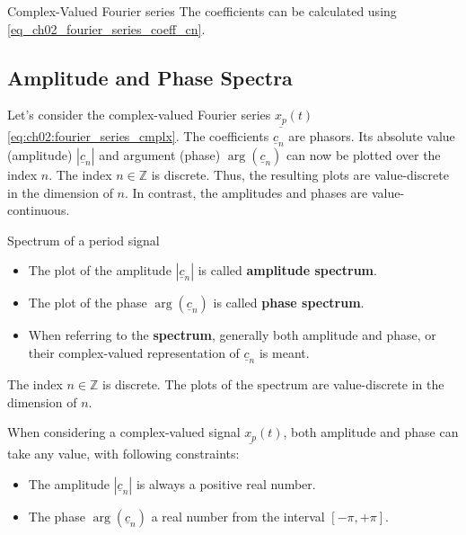 \begin{refsection}
\begin{definition}{Complex-Valued Fourier series}
	The coefficients can be calculated using \eqref{eq_ch02_fourier_series_coeff_cn}.
\end{definition}

\subsection{Amplitude and Phase Spectra}

Let's consider the complex-valued Fourier series $\underline{x_p}(t)$ \eqref{eq:ch02:fourier_series_cmplx}. The coefficients $\underline{c}_n$ are phasors. Its absolute value (amplitude) $|\underline{c}_n|$ and argument (phase) $\arg\left(\underline{c}_n\right)$ can now be plotted over the index $n$. The index $n \in \mathbb{Z}$ is discrete. Thus, the resulting plots are value-discrete in the dimension of $n$. In contrast, the amplitudes and phases are value-continuous.

\begin{definition}{Spectrum of a period signal}
	\begin{itemize}
		\item The plot of the amplitude $|\underline{c}_n|$ is called  \textbf{amplitude spectrum}.
		\item The plot of the phase $\arg\left(\underline{c}_n\right)$ is called  \textbf{phase spectrum}.
		\item When referring to the  \textbf{spectrum}, generally both amplitude and phase, or their complex-valued representation of $\underline{c}_n$ is meant.
	\end{itemize}
\end{definition}

\begin{fact}
	The index $n \in \mathbb{Z}$ is discrete. The plots of the spectrum are value-discrete in the dimension of $n$.
\end{fact}

When considering a complex-valued signal $\underline{x_p}(t)$, both amplitude and phase can take any value, with following constraints:
\begin{itemize}
	\item The amplitude $|\underline{c}_n|$ is always a positive real number.
	\item The phase $\arg\left(\underline{c}_n\right)$ a real number from the interval $[-\pi, +\pi]$.
\end{itemize}%
%


\end{refsection}
